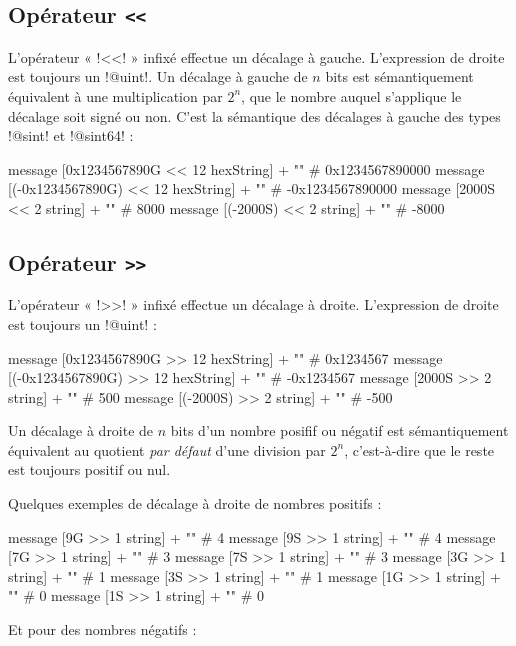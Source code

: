 \subsection{Opérateur \texttt{<{}<}}

L'opérateur « \ggs!<<! » infixé effectue un décalage à gauche. L'expression de droite est toujours un \ggs!@uint!. Un décalage à gauche de $n$ bits est sémantiquement équivalent à une multiplication par $2^n$, que le nombre auquel s'applique le décalage soit signé ou non. C'est la sémantique des décalages à gauche des types \ggs!@sint! et \ggs!@sint64! :

\begin{galgas}
  message [0x1234567890G << 12 hexString] + "\n" # 0x1234567890000
  message [(-0x1234567890G) << 12 hexString] + "\n" # -0x1234567890000
  message [2000S << 2 string] + "\n" # 8000
  message [(-2000S) << 2 string] + "\n" # -8000
\end{galgas}

\subsection{Opérateur \texttt{>{}>}}

L'opérateur « \ggs!>>! » infixé effectue un décalage à droite. L'expression de droite est toujours un \ggs!@uint! :
\begin{galgas}
  message [0x1234567890G >> 12 hexString] + "\n" # 0x1234567
  message [(-0x1234567890G) >> 12 hexString] + "\n" # -0x1234567
  message [2000S >> 2 string] + "\n" # 500
  message [(-2000S) >> 2 string] + "\n" # -500
\end{galgas}

Un décalage à droite de $n$ bits d'un nombre posifif ou négatif est sémantiquement équivalent au quotient \emph{par défaut} d'une division par $2^n$, c'est-à-dire que le reste est toujours positif ou nul.

Quelques exemples de décalage à droite de nombres positifs :

\begin{galgas}
  message [9G >> 1 string] + "\n" # 4
  message [9S >> 1 string] + "\n" # 4
  message [7G >> 1 string] + "\n" # 3
  message [7S >> 1 string] + "\n" # 3
  message [3G >> 1 string] + "\n" # 1
  message [3S >> 1 string] + "\n" # 1
  message [1G >> 1 string] + "\n" # 0
  message [1S >> 1 string] + "\n" # 0
\end{galgas}


Et pour des nombres négatifs :

